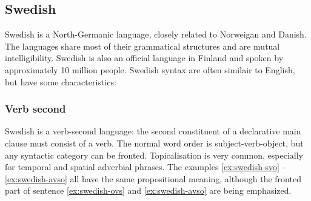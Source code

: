 \documentclass{report}
\begin{document}
\subsection{Swedish}
Swedish\cite{SAG:intro} is a North-Germanic language,
closely related to Norweigan and Danish. The languages share most of their
grammatical structures and are mutual intelligibility. Swedish is also 
an official language in Finland and spoken by approximately 10 million people.
Swedish syntax are often similair to English, but have some characteristics:
\subsubsection*{Verb second}
Swedish is a verb-second language: the
second constituent of a declarative main clause must consist of a verb.
The normal word order is subject-verb-object, but any syntactic category can be fronted\cite{H&H:1027}.
Topicalisation is very common, especially for temporal and spatial adverbial phrases.
The examples \ref{ex:swedish-svo} - \ref{ex:swedish-avso} all have the same propositional
meaning, although the fronted part of sentence \ref{ex:swedish-ovs} and \ref{ex:swedish-avso} are being emphasized.
 \label{ex:swedish-svo}
\label{ex:swedish-ovs} 
 \label{ex:swedish-avso}

\end{document}
